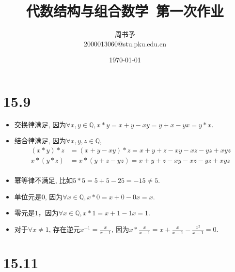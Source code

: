\documentclass[8pt]{article}
\title{\heiti\zihao{1} 代数结构与组合数学\ 第一次作业}
\author{\kaishu\zihao{-3} 周书予\\2000013060@stu.pku.edu.cn}
\date{\today}
\theoremstyle{compact}
\begin{document}
\pagestyle{fancy}


\maketitle

\iffalse
课本p. 238: 9, 11, 14, 16
（以下内容周四会讲到）
p. 238: 18
p. 239: 24(1)(3), 29, 30
\fi

\section*{15.9}

\begin{itemize}
	\item 交换律满足, 因为$\forall x, y \in \mathbb Q, x * y = x + y - xy = y + x - yx = y * x$.
	\item 结合律满足, 因为$\forall x, y, z \in \mathbb Q$, \begin{align*}
		(x * y) * z &= (x + y - xy) * z = x + y + z - xy - xz - yz + xyz\\
		x * (y * z) &= x * (y + z - yz) = x + y + z - xy - xz - yz + xyz\\
	\end{align*}
	\item 幂等律不满足, 比如$5 * 5 = 5 + 5 - 25 = -15 \neq 5$.
	\item 单位元是$0$, 因为$\forall x \in \mathbb Q, x * 0 = x + 0 - 0x = x$.
	\item 零元是$1$，因为$\forall x \in \mathbb Q, x * 1 = x + 1 - 1x = 1$.
	\item 对于$\forall x \neq 1$, 存在逆元$x^{-1} = \frac{x}{x-1}$, 因为$x * \frac{x}{x-1} = x + \frac{x}{x-1} - \frac{x^2}{x-1} = 0$.
\end{itemize}

\section*{15.11}
\end{document}

